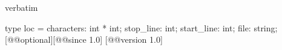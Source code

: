 \begin{camlexample}{verbatim}
\begin{caml}
\begin{camlinput}
type loc = {
  characters: int * int;
  stop_line: int;
  start_line: int;
  file: string;
} [@@optional][@@since 1.0]
[@@version 1.0]
\end{camlinput}
\end{caml}
\end{camlexample}

